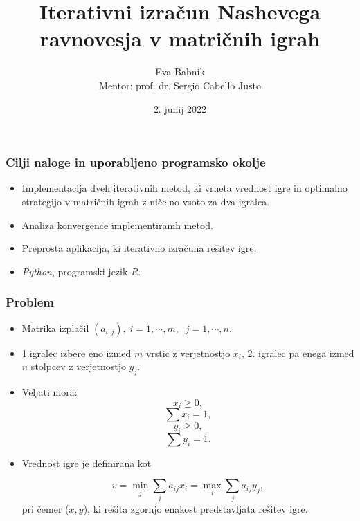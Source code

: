 \documentclass{beamer}
\title[Iterativni izračun Nashevega ravnovesja]{Iterativni izračun Nashevega ravnovesja v matričnih igrah}
\author[Eva Babnik]{Eva Babnik \\ Mentor: prof. dr. Sergio Cabello Justo}
\institute[]{Fakulteta za matematiko in fiziko}
\date{2. junij 2022}
\theoremstyle{definition}
\theoremstyle{plain}
\begin{document}
\frame{\titlepage}
\begin{frame}
\frametitle{Cilji naloge in uporabljeno programsko okolje}

\begin{itemize}
\item Implementacija dveh iterativnih metod, ki vrneta vrednost igre in optimalno strategijo v matričnih igrah z ničelno vsoto za dva igralca.
\item Analiza konvergence implementiranih metod.
\item Preprosta aplikacija, ki iterativno izračuna rešitev igre.
\item  \textit{Python}, programski jezik \textit{R}.
\end{itemize}

\end{frame}
\begin{frame}
    \frametitle{Problem}
    \begin{itemize}
        \item Matrika izplačil $ (a_{i,j}), \; i = 1, \cdots, m, \; \;   j =1,\cdots,n.$
        \item 1.igralec izbere eno izmed $m$ vrstic z verjetnostjo $x_i$, 2. igralec pa enega izmed $n$ stolpcev z verjetnostjo $y_j$.
        \item Veljati mora:
        \begin{equation}
            \label{eqn:e1}
            x_i \geq 0,
        \end{equation}
        \begin{equation}
            \label{eqn:e2}
            \sum x_i = 1,
        \end{equation}
        \begin{equation}
            \label{eqn:e3}
        y_i \geq 0,
        \end{equation}
        \begin{equation}
            \label{eqn:e4}
            \sum y_i = 1.
        \end{equation}
        \item Vrednost igre je definirana kot

        \begin{equation*}
            v = \min_j \sum_{i} a_{ij}x_i = \max_i \sum_j a_{ij} y_j,
        \end{equation*}
        pri čemer ($x, y$), ki rešita zgornjo enakost predstavljata rešitev igre.
    \end{itemize}
\end{frame}
\end{document}
